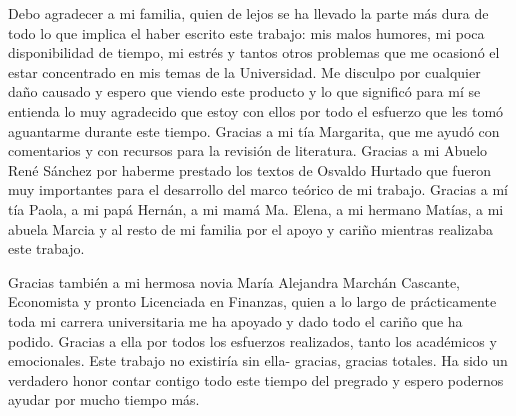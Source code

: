 \documentclass[floatsintext,man]{apa7}\usepackage[]{graphicx}\usepackage[]{color}
\begin{document}
Debo agradecer a mi familia, quien de lejos se ha llevado la parte más dura de todo lo que implica el haber escrito este trabajo: mis malos humores, mi poca disponibilidad de tiempo, mi estrés y tantos otros problemas que me ocasionó el estar concentrado en mis temas de la Universidad. Me disculpo por cualquier daño causado y espero que viendo este producto y lo que significó para mí se entienda lo muy agradecido que estoy con ellos por todo el esfuerzo que les tomó aguantarme durante este tiempo. Gracias a mi tía Margarita, que me ayudó con comentarios y con recursos para la revisión de literatura. Gracias a mi Abuelo René Sánchez por haberme prestado los textos de Osvaldo Hurtado que fueron muy importantes para el desarrollo del marco teórico de mi trabajo. Gracias a mí tía Paola, a mi papá Hernán, a mi mamá Ma. Elena, a mi hermano Matías, a mi abuela Marcia y al resto de mi familia por el apoyo y cariño mientras realizaba este trabajo. 

Gracias también a mi hermosa novia María Alejandra Marchán Cascante, Economista y pronto Licenciada en Finanzas, quien a lo largo de prácticamente toda mi carrera universitaria me ha apoyado y dado todo el cariño que ha podido. Gracias a ella por todos los esfuerzos realizados, tanto los académicos y emocionales. Este trabajo no existiría sin ella- gracias, gracias totales. Ha sido un verdadero honor contar contigo todo este tiempo del pregrado y espero podernos ayudar por mucho tiempo más. 
\end{document}
